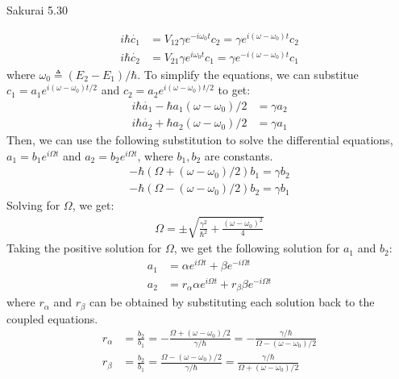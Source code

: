 \documentclass{article}
\begin{document}
\begin{section}{Sakurai 5.30}
\begin{enumerate}
	\begin{tcolorbox}[breakable]
		\begin{align*}
			i \hbar \dot{c_1} & = V_{12} \gamma e^{-i\omega_0 t} c_2 = \gamma e^{i (\omega - \omega_0)t} c_2  \\
			i \hbar \dot{c_2} & = V_{21} \gamma e^{i \omega_0 t} c_1 = \gamma e^{-i (\omega - \omega_0)t} c_1
		\end{align*}
		where $\omega_0 \triangleq (E_2 - E_1)/\hbar$. To simplify the equations, we can substitue $c_1 = a_1 e^{i (\omega - \omega_0)t/2}$ and $c_2 = a_2 e^{i (\omega - \omega_0)t/2}$ to get:
		\begin{align*}
			i \hbar \dot{a_1} - \hbar a_1 (\omega - \omega_0)/2 & = \gamma a_2 \\
			i \hbar \dot{a_2} + \hbar a_2 (\omega - \omega_0)/2 & = \gamma a_1
		\end{align*}
		Then, we can use the following substitution to solve the differential equations, $a_1 = b_1 e^{i \Omega t}$ and $a_2 = b_2 e^{i \Omega t}$, where $b_1, b_2$ are constants.
		\begin{align*}
			-\hbar (\Omega + (\omega - \omega_0)/2) b_1 = \gamma b_2 \\
			-\hbar (\Omega - (\omega - \omega_0)/2) b_2 = \gamma b_1
		\end{align*}
		Solving for $\Omega$, we get:
		\begin{align*}
			\Omega = \pm \sqrt{\frac{\gamma^2}{\hbar^2} + \frac{(\omega - \omega_0)^2}{4}}
		\end{align*}
		Taking the positive solution for $\Omega$, we get the following solution for $a_1$ and $b_2$:
		\begin{align*}
			a_1 & = \alpha e^{i \Omega t} + \beta e^{-i \Omega t}                  \\
			a_2 & = r_\alpha \alpha e^{i \Omega t} + r_\beta \beta e^{-i \Omega t}
		\end{align*}
		where $r_\alpha$ and $r_\beta$ can be obtained by substituting each solution back to the coupled equations.
		\begin{align*}
			r_\alpha & = \frac{b_2}{b_1} = -\frac{\Omega + (\omega - \omega_0)/2}{\gamma/\hbar} = -\frac{\gamma/\hbar}{\Omega - (\omega - \omega_0)/2} \\
			r_\beta  & = \frac{b_2}{b_1} = \frac{\Omega - (\omega - \omega_0)/2}{\gamma/\hbar} = \frac{\gamma/\hbar}{\Omega + (\omega - \omega_0)/2}
		\end{align*}


\end{tcolorbox}
\end{enumerate}
\end{section}
\end{document}
